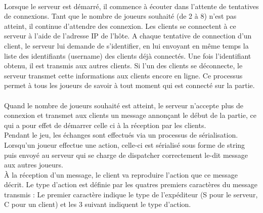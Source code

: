 \documentclass[12pt]{report}
\begin{document}
\paragraph{}
Lorsque le serveur est démarré, il commence à écouter dans l’attente de tentatives de connexions. Tant que le nombre de joueurs souhaité (de 2 à 8) n’est pas atteint, il continue d’attendre des connexion. Les clients se connectent à ce serveur à l’aide de l’adresse IP de l’hôte. A chaque tentative de connection d’un client, le serveur lui demande de s’identifier, en lui envoyant en même temps la liste des identifiants (username) des clients déjà connectés. Une fois l’identifiant obtenu, il est transmis aux autres clients. Si l’un des clients se déconnecte, le serveur transmet cette informations aux clients encore en ligne. Ce processus permet à tous les joueurs de savoir à tout moment qui est connecté sur la partie.\\

\paragraph{}
Quand le nombre de joueurs souhaité est atteint, le serveur n'accepte plus de connexion et transmet aux clients un message annonçant le début de la partie, ce qui a pour effet de démarrer celle ci à la réception par les clients.\\
Pendant le jeu, les échanges sont effectués via un processus de sérialisation. Lorsqu’un joueur effectue une action, celle-ci est sérialisé sous forme de string puis envoyé au serveur qui se charge de dispatcher correctement le-dit message aux autres joueurs. \\
À la réception d’un message, le client va reproduire l’action que ce message décrit. Le type d’action est définie par les quatres premiers caractères du message transmis : Le premier caractère indique le type de l’expéditeur (S pour le serveur, C pour un client) et les 3 suivant indiquent le type d’action.\\
\end{document}
